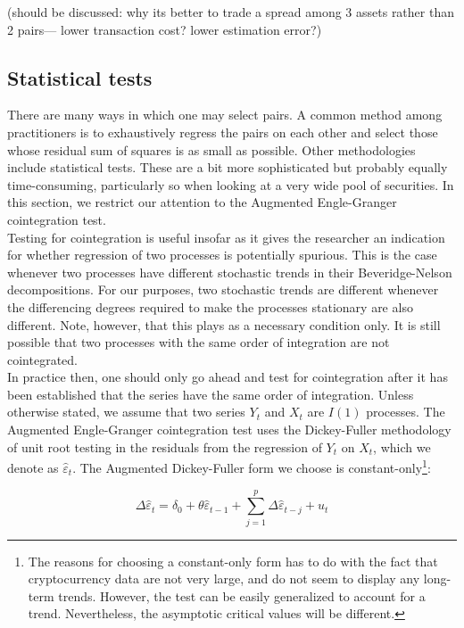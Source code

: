 \documentclass[a4paper,11pt]{article}
\theoremstyle{remark}
\theoremstyle{plain}
\newcommand\ab[1]{{\color{blue} #1 }}
\begin{document}
\ab{(should be discussed: why its better to trade a spread among 3 assets rather than 2 pairs--- lower transaction cost? lower estimation error?) }

\subsection{Statistical tests}
 
There are many ways in which one may select pairs. A common method among practitioners is to exhaustively regress the pairs on each other and select those whose residual sum of squares is as small as possible. Other methodologies include statistical tests. These are a bit more sophisticated but probably equally time-consuming, particularly so when looking at a very wide pool of securities. In this section, we restrict our attention to the Augmented Engle-Granger cointegration test.\\

Testing for cointegration is useful insofar as it gives the researcher an indication for whether regression of two processes is potentially spurious. This is the case whenever two processes have different stochastic trends in their Beveridge-Nelson decompositions. For our purposes, two stochastic trends are different whenever the differencing degrees required to make the processes stationary are also different. Note, however, that this plays as a necessary condition only. It is still possible that two processes with the same order of integration are not cointegrated.\\


In practice then, one should only go ahead and test for cointegration after it has been established that the series have the same order of integration. Unless otherwise stated, we assume that two series $Y_{t}$ and $X_{t}$ are $I(1)$ processes. The Augmented Engle-Granger cointegration test uses the Dickey-Fuller methodology of unit root testing in the residuals from the regression of $Y_{t}$ on $X_{t}$, which we denote as $\hat{\varepsilon}_{t}$. The Augmented Dickey-Fuller form we choose is constant-only\footnote{The reasons for choosing a constant-only form has to do with the fact that cryptocurrency data are not very large, and do not seem to display any long-term trends. However, the test can be easily generalized to account for a trend. Nevertheless, the asymptotic critical values will be different.}:

\[\Delta\hat{\varepsilon}_{t}=\delta_{0}+\theta\hat{\varepsilon}_{t-1}+\sum_{j=1}^p \Delta \hat{\varepsilon}_{t-j} + u_{t}\]
\end{document}
